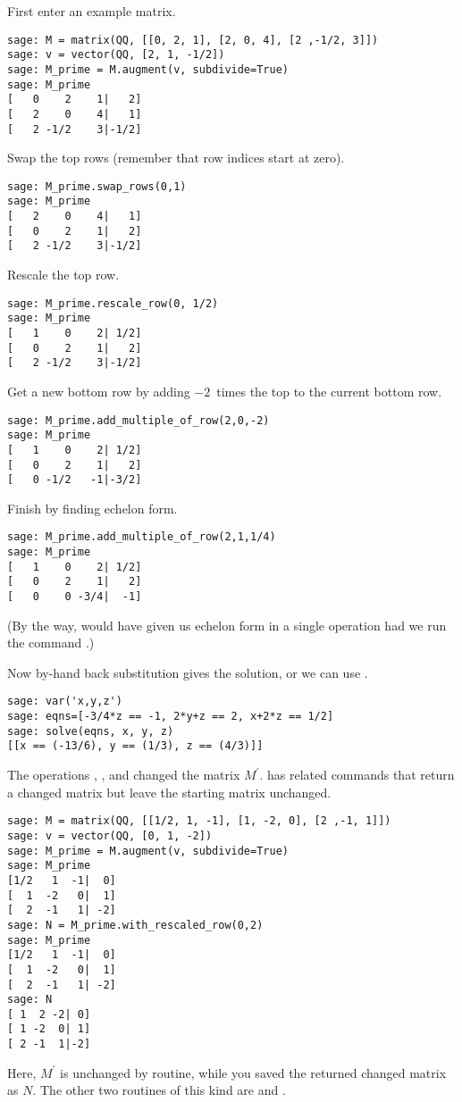 First enter an example matrix.
\begin{lstlisting}
sage: M = matrix(QQ, [[0, 2, 1], [2, 0, 4], [2 ,-1/2, 3]])
sage: v = vector(QQ, [2, 1, -1/2])                        
sage: M_prime = M.augment(v, subdivide=True)              
sage: M_prime                                             
[   0    2    1|   2]
[   2    0    4|   1]
[   2 -1/2    3|-1/2]
\end{lstlisting}
Swap the top rows (remember that row indices start at zero).
\begin{lstlisting}
sage: M_prime.swap_rows(0,1)
sage: M_prime
[   2    0    4|   1]
[   0    2    1|   2]
[   2 -1/2    3|-1/2]
\end{lstlisting}
Rescale the top row.
\begin{lstlisting}
sage: M_prime.rescale_row(0, 1/2)
sage: M_prime
[   1    0    2| 1/2]
[   0    2    1|   2]
[   2 -1/2    3|-1/2]  
\end{lstlisting}
Get a new  bottom row by adding $-2$~times the top to the current bottom
row.
\begin{lstlisting}
sage: M_prime.add_multiple_of_row(2,0,-2)
sage: M_prime
[   1    0    2| 1/2]
[   0    2    1|   2]
[   0 -1/2   -1|-3/2]  
\end{lstlisting}
Finish by finding echelon form.
\begin{lstlisting}
sage: M_prime.add_multiple_of_row(2,1,1/4)
sage: M_prime                             
[   1    0    2| 1/2]
[   0    2    1|   2]
[   0    0 -3/4|  -1]  
\end{lstlisting}
(By the way,
\Sage{} would have given us echelon form in a single operation 
had we run the command
.)

Now by-hand back substitution gives the solution, or we can 
use .
\begin{lstlisting}
sage: var('x,y,z')
sage: eqns=[-3/4*z == -1, 2*y+z == 2, x+2*z == 1/2]
sage: solve(eqns, x, y, z)
[[x == (-13/6), y == (1/3), z == (4/3)]]
\end{lstlisting}

The operations ,
, and 
changed the matrix $M^\prime$.
\Sage{} has related commands that return a changed matrix
but leave the starting matrix unchanged.
\begin{lstlisting}
sage: M = matrix(QQ, [[1/2, 1, -1], [1, -2, 0], [2 ,-1, 1]])
sage: v = vector(QQ, [0, 1, -2])
sage: M_prime = M.augment(v, subdivide=True) 
sage: M_prime
[1/2   1  -1|  0]
[  1  -2   0|  1]
[  2  -1   1| -2]
sage: N = M_prime.with_rescaled_row(0,2)
sage: M_prime
[1/2   1  -1|  0]
[  1  -2   0|  1]
[  2  -1   1| -2]
sage: N      
[ 1  2 -2| 0]
[ 1 -2  0| 1]
[ 2 -1  1|-2]  
\end{lstlisting}
Here, $M^\prime$ is unchanged by routine, while you saved the returned 
changed matrix as $N$.
The other two routines of this kind are  
and .




